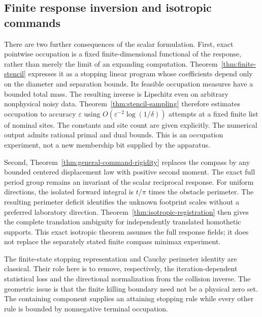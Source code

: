 \subsection{Finite response inversion and isotropic commands}
There are two further consequences of the scalar formulation. First,
exact pointwise occupation is a fixed finite-dimensional functional of
the response, rather than merely the limit of an expanding computation.
Theorem~\ref{thm:finite-stencil} expresses it as a stopping linear
program whose coefficients depend only on the diameter and separation
bounds. Its feasible occupation measures have a bounded total mass.
The resulting inverse is Lipschitz even on arbitrary nonphysical noisy
data. Theorem~\ref{thm:stencil-sampling} therefore estimates occupation
to accuracy $\varepsilon$ using $O(\varepsilon^{-2}\log(1/\delta))$
attempts at a fixed finite list of nominal sites. The constants and
site count are given explicitly. The numerical output admits rational
primal and dual bounds. This is an occupation experiment, not a new
membership bit supplied by the apparatus.

Second, Theorem~\ref{thm:general-command-rigidity} replaces the compass
by any bounded centered displacement law with positive second moment.
The exact full period group remains an invariant of the scalar
reciprocal response. For uniform directions, the isolated forward
integral is $t/\pi$ times the obstacle perimeter. The resulting
perimeter deficit identifies the unknown footprint scales without a
preferred laboratory direction. Theorem~\ref{thm:isotropic-registration}
then gives the complete translation ambiguity for independently
translated homothetic supports. This exact isotropic theorem assumes
the full response fields; it does not replace the separately stated
finite compass minimax experiment.

The finite-state stopping representation and Cauchy perimeter identity
are classical. Their role here is to remove, respectively, the
iteration-dependent statistical loss and the directional normalization
from the collision inverse. The geometric issue is that the finite
killing boundary need not be a physical zero set. The containing
component supplies an attaining stopping rule while every other rule
is bounded by nonnegative terminal occupation.
